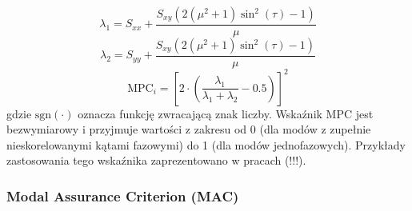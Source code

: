 \begin{equation}
	\lambda_{1}=S_{xx}+\frac{S_{xy}(2(\mu^{2}+1)\sin^{2}{(\tau)}-1)}{\mu}
\end{equation}
\begin{equation}
	\lambda_{2}=S_{yy}+\frac{S_{xy}(2(\mu^{2}+1)\sin^{2}{(\tau)}-1)}{\mu}
\end{equation}
\begin{equation} \label{eq:mpc_ratio}
	\mathrm{MPC}_{i}=\left[2\cdot\left(\frac{\lambda_{1}}{\lambda_{1}+\lambda_{2}}-0.5\right)\right]^{2}
\end{equation}
gdzie $\mathrm{sgn}(\cdot)$ oznacza funkcję zwracającą znak liczby. Wskaźnik MPC jest bezwymiarowy i przyjmuje wartości z zakresu od 0 (dla modów z zupełnie nieskorelowanymi kątami fazowymi) do 1 (dla modów jednofazowych). Przykłady zastosowania tego wskaźnika zaprezentowano w pracach (!!!).
\subsubsection{Modal Assurance Criterion (MAC)}

